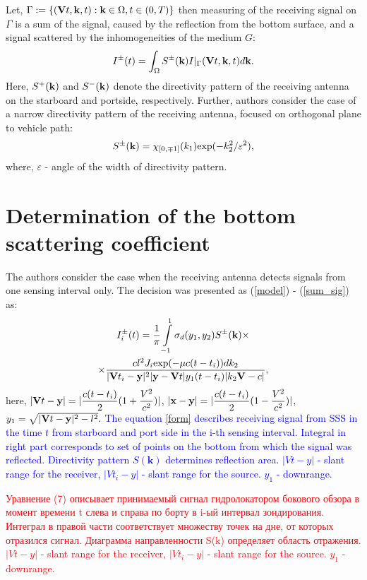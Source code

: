 \documentclass{procDDs}
\begin{document}
Let, $\Gamma := \{ (\mathbf{V}t, \mathbf{k}, t): \mathbf{k} \in \Omega, t \in (0,T) \}$  then measuring of the receiving signal on $\Gamma$ is a sum of the signal, caused by the reflection from the bottom surface, and a signal scattered by the inhomogeneities of the medium $G$:
\begin{multline}
	\label{sum_sig}
	I^\pm(t) = \int_{\Omega} S^\pm(\mathbf{k}) I|_{\Gamma}(\mathbf{V}t, \mathbf{k}, t)d\mathbf{k}.
\end{multline}
Here, $S^+(\mathbf{k})$ and $S^-(\mathbf{k})$ denote the directivity pattern of the receiving antenna on the starboard and portside, respectively. Further, authors consider the case of a narrow directivity pattern of the receiving antenna, focused on orthogonal plane to vehicle path:
\begin{equation}
\label{diagram}
S^\pm(\mathbf{k}) = \chi_{[0,\mp1]}(k_1)  \text{exp}(-k_2^2/\varepsilon^2),
\end{equation}
where, $\varepsilon $ - angle of the width of directivity pattern.

\section{Determination of the bottom scattering coefficient}

The authors consider the case when the receiving antenna detects signals from one sensing interval only. The decision was presented as (\ref{model}) - (\ref{sum_sig}) as:
\begin{multline}
	\label{form}
	I^\pm_i(t) = \frac{1}{\pi}\int\limits_{-1}^{1}\sigma_d(y_1,y_2) S^{\pm}(\mathbf{k}) \times \\ \times
	\frac{ cl^2J_i \text{exp}(-\mu c(t-t_i))dk_2}{|\mathbf{V}t_i-\mathbf{y}|^2|\mathbf{y}-\mathbf{V}t|y_1(t-t_i)|k_2 \mathbf{V}-c|},
\end{multline}
here, $|\mathbf{V}t - \mathbf{y}| = |\dfrac{c(t-t_i)}{2}(1+\dfrac{V^2}{c^2})|$, $|\mathbf{x}-\mathbf{y}| = |\dfrac{c(t-t_i)}{2}(1-\dfrac{V^2}{c^2})|$, $y_1 = \sqrt{|\mathbf{V}t-\mathbf{y}|^2 - l^2}.$
\textcolor{blue}{The equation \ref{form} describes receiving signal from SSS in the time $t$ from starboard and port side in the i-th sensing interval. Integral in right part corresponds to set of points on the bottom from which the signal was reflected. Directivity pattern $S(\textbf{k})$ determines reflection area. $|Vt-y|$ - slant range for the receiver, $|Vt_i-y|$   - slant range for the source. $y_1$ - downrange.}

\textcolor{red}{Уравнение (7) описывает принимаемый сигнал гидролокатором бокового обзора в момент времени t  слева и справа по борту в i-ый интервал зондирования. Интеграл в правой части соответствует множеству точек на дне, от которых отразился сигнал. Диаграмма направленности S(k) определяет область отражения. $|Vt-y|$ - slant range for the receiver, $|Vt_i-y|$   - slant range for the source. $y_1$ - downrange.}
\end{document}
